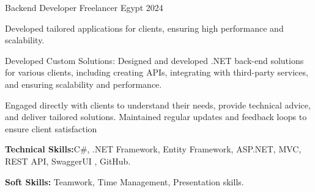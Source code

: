 \begin{cventries}
     \cventry
    {Backend Developer} %
    {Freelancer} %
    {Egypt} %
    {2024} %
    {
      \begin{cvitems} %
        \item {Developed tailored applications for clients, ensuring high performance and scalability.}
        \item {Developed Custom Solutions: Designed and developed .NET back-end solutions for various clients, including creating APIs, integrating with third-party services, and ensuring scalability and performance.}
        \item {Engaged directly with clients to understand their needs, provide technical advice, and deliver tailored solutions. Maintained regular updates and feedback loops to ensure client satisfaction}
        \item {\textbf{Technical Skills:}C\#, .NET Framework, Entity Framework, ASP.NET, MVC, REST API, SwaggerUI , GitHub.}
        \item {\textbf{Soft Skills:} Teamwork, Time Management, Presentation skills.}
      \end{cvitems}
    }

\end{cventries}
